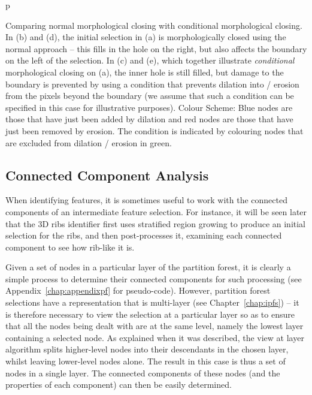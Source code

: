 \begin{stusubfig}{p}
\caption{Comparing normal morphological closing with conditional morphological closing. In (b) and (d), the initial selection in (a) is morphologically closed using the normal approach -- this fills in the hole on the right, but also affects the boundary on the left of the selection. In (c) and (e), which together illustrate \emph{conditional} morphological closing on (a), the inner hole is still filled, but damage to the boundary is prevented by using a condition that prevents dilation into / erosion from the pixels beyond the boundary (we assume that such a condition can be specified in this case for illustrative purposes). Colour Scheme: Blue nodes are those that have just been added by dilation and red nodes are those that have just been removed by erosion. The condition is indicated by colouring nodes that are excluded from dilation / erosion in green.}
\label{fig:featureid-techniques-conditionalclosing}
\end{stusubfig}

\subsection{Connected Component Analysis}

When identifying features, it is sometimes useful to work with the connected components of an intermediate feature selection. For instance, it will be seen later that the 3D ribs identifier first uses stratified region growing to produce an initial selection for the ribs, and then post-processes it, examining each connected component to see how rib-like it is.

Given a set of nodes in a particular layer of the partition forest, it is clearly a simple process to determine their connected components for such processing (see Appendix~\ref{chap:appendixpf} for pseudo-code). However, partition forest selections have a representation that is multi-layer (see Chapter~\ref{chap:ipfs}) -- it is therefore necessary to view the selection at a particular layer so as to ensure that all the nodes being dealt with are at the same level, namely the lowest layer containing a selected node. As explained when it was described, the view at layer algorithm splits higher-level nodes into their descendants in the chosen layer, whilst leaving lower-level nodes alone. The result in this case is thus a set of nodes in a single layer. The connected components of these nodes (and the properties of each component) can then be easily determined.

